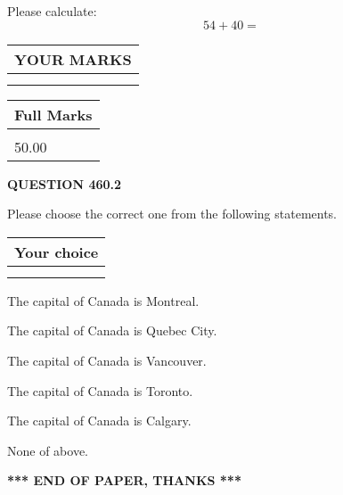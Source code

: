\documentclass[12pt]{article}
\begin{document}
  
 
Please calculate:
\begin{equation}
54 +  %
40 = \nonumber
\end{equation}
 

 

 
  
\vspace{0.2in}
  
\noindent\begin{tabular}{|l|}
\hline
 YOUR MARKS  \\
\hline
 \\ 
 \\ 
\hline
\end{tabular}
\hspace{0.05in} \begin{tabular}{|l|}
\hline
 Full Marks  \\
\hline
 \\ 
50.00 \\
\hline
\end{tabular}
{\textbf{\Large{QUESTION
460.2 
}}}
  
  
Please choose the correct one from the following statements.
  
  
\noindent\hspace{3.0in} \begin{tabular}{|l|}
\hline
Your choice \\
\hline
 \\ 
 \\ 
\hline
\end{tabular}
  
  
 
 
The capital of Canada is Montreal.
 
 
The capital of Canada is Quebec City.
 
 
The capital of Canada is Vancouver.
 
 
The capital of Canada is Toronto.
 
 
The capital of Canada is Calgary.
 
 
 None of above.
 
 
   
   
 \vspace{0.2in}
 
   
   
   
   
\vspace{1.0in} 
{\textbf{\large{ *** END OF PAPER, THANKS *** }}} 
   
\end{document}
